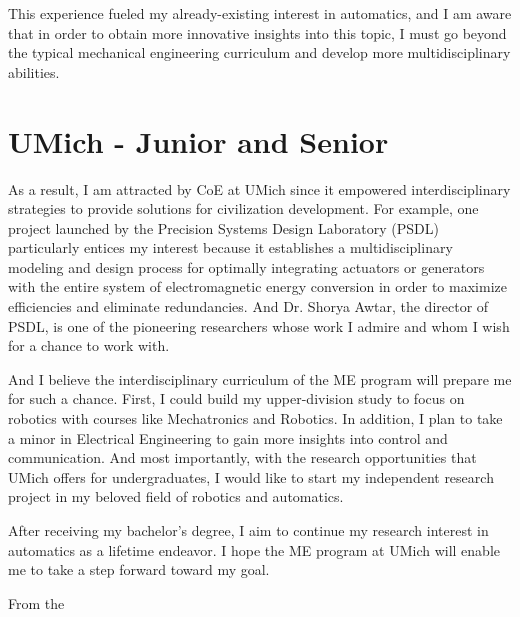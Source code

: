 \documentclass[12pt]{article}
\begin{document}
This experience fueled my already-existing interest in automatics, and I am aware that in order to obtain more innovative insights into this topic, I must go beyond the typical mechanical engineering curriculum and develop more multidisciplinary abilities.

\section {UMich - Junior and Senior}

As a result, I am attracted by CoE at UMich since it empowered interdisciplinary strategies to provide solutions for civilization development. For example, one project launched by the Precision Systems Design Laboratory (PSDL) particularly entices my interest because it establishes a multidisciplinary modeling and design process for optimally integrating actuators or generators with the entire system of electromagnetic energy conversion in order to maximize efficiencies and eliminate redundancies. And Dr. Shorya Awtar, the director of PSDL, is one of the pioneering researchers whose work I admire and whom I wish for a chance to work with. 


And I believe the interdisciplinary curriculum of the ME program will prepare me for such a chance. First, I could build my upper-division study to focus on robotics with courses like Mechatronics and Robotics. In addition, I plan to take a minor in Electrical Engineering to gain more insights into control and communication. And most importantly, with the research opportunities that UMich offers for undergraduates, I would like to start my independent research project in my beloved field of robotics and automatics. 

After receiving my bachelor's degree, I aim to continue my research interest in automatics as a lifetime endeavor. I hope the ME program at UMich will enable me to take a step forward toward my goal. 

From the 

\end{document}
